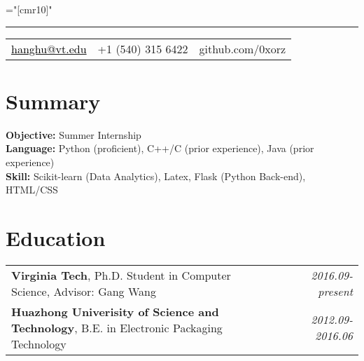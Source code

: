 \documentclass[a4paper,10pt]{article}
\begin{document}
\pagestyle{empty} %

\font\fb="[cmr10]" %
\bigskip

\hrule height 0.7mm \vspace{-0.4em}
\begin{tabular}{p{4.0cm}p{4.0cm}p{4.0cm}}
{\small \href{mailto:hanghu@vt.edu}{\textcolor{black}{hanghu@vt.edu}}}
&{\small +1 (540) 315 6422}
&{\small github.com/0xorz}
   \\
\end{tabular}
\section{Summary}
\begin{flushleft}
\hspace{1em} \textbf{Objective:} Summer Internship \\
\hspace{1em} \textbf{Language:} Python (proficient), C++/C (prior experience), Java (prior experience) \\
\hspace{1em} \textbf{Skill:} Scikit-learn (Data Analytics), Latex, Flask (Python Back-end), HTML/CSS\\
\end{flushleft}

\section{Education}
\begin{tabular}{p{14cm}p{0cm}r}
\textbf{Virginia Tech}, Ph.D. Student in Computer Science, Advisor: Gang Wang && \emph{2016.09-present} \\
\textbf{Huazhong Univerisity of Science and Technology}, B.E. in Electronic Packaging Technology && \emph{2012.09-2016.06} \\
\end{tabular}
\end{document}

